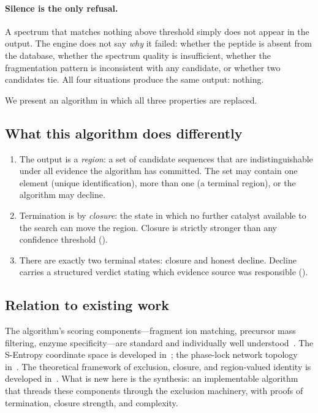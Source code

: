 \documentclass[11pt,a4paper]{article}
\theoremstyle{definition}
\theoremstyle{remark}
\begin{document}
\paragraph{Silence is the only refusal.} A spectrum that matches nothing
above threshold simply does not appear in the output. The engine does
not say \emph{why} it failed: whether the peptide is absent from the
database, whether the spectrum quality is insufficient, whether the
fragmentation pattern is inconsistent with any candidate, or whether two
candidates tie. All four situations produce the same output: nothing.

We present an algorithm in which all three properties are replaced.

\subsection{What this algorithm does differently}

\begin{enumerate}[label=(\roman*),leftmargin=2.2em,itemsep=2pt]
  \item The output is a \emph{region}: a set of candidate sequences
  that are indistinguishable under all evidence the algorithm has
  committed. The set may contain one element (unique identification),
  more than one (a terminal region), or the algorithm may decline.
  \item Termination is by \emph{closure}: the state in which no
  further catalyst available to the search can move the region. Closure
  is strictly stronger than any confidence threshold
  ().
  \item There are exactly two terminal states: closure and honest
  decline. Decline carries a structured verdict stating which evidence
  source was responsible ().
\end{enumerate}

\subsection{Relation to existing work}

The algorithm's scoring components---fragment ion matching, precursor
mass filtering, enzyme specificity---are standard and individually
well understood~\citep{eng1994approach,paizs2005fragmentation,%
olsen2004trypsin,krokhin2006sequence}. The S-Entropy coordinate space
is developed in~\citet{sachikonye2025molecular}; the phase-lock
network topology in~\citet{sachikonye2025fragmentation}. The
theoretical framework of exclusion, closure, and region-valued identity
is developed in~\citet{sachikonye2025peptide}. What is new here is the
synthesis: an implementable algorithm that threads these components
through the exclusion machinery, with proofs of termination, closure
strength, and complexity.
\end{document}
